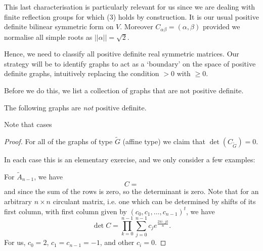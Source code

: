 This last characterisation is particularly relevant for us since we are dealing
with finite reflection groups for which (3) holds by construction. It is our
usual positive definite bilinear symmetric form on $V$.
Moreover $C_{\alpha \beta} = (\alpha, \beta)$ provided we normalise all simple
roots as $||\alpha|| = \sqrt{2}$.

Hence, we need to classify all positive definite real symmetric matrices.
Our strategy will be to identify graphs
to act as a `boundary' on the space of positive definite graphs, intuitively
replacing the condition $>0$ with $\geq 0$.

Before we do this, we list a collection of graphs that are not positive definite.

\begin{lemma}
The following graphs are {\em not} positive definite.
\end{lemma}


Note that cases

\begin{proof}
For all of the graphs of type $\widetilde{G}$ (affine type) we claim that $\det
(C_{\widetilde{G}}) = 0$.

In each case this is an elementary exercise, and we only consider a few examples:

For $\widetilde{A}_{n-1}$, we have
\[
    C = %
\]
and since the sum of the rows is zero, so the determinant is zero.
Note that for an arbitrary $n \times n$ circulant matrix, i.e. one which can
be determined by shifts of its first column, with first column given by
$(c_0, c_1, \dots, c_{n-1})^t$, we have
\[
    \det C = \prod_{k=0}^{n-1} \sum_{j=0}^{n-1} c_j e^{\frac{2\pi i \cdot jk}{n}}.
\]
For us, $c_0 = 2$, $c_1 = c_{n-1} = -1$, and other $c_i = 0$.
\end{proof}
